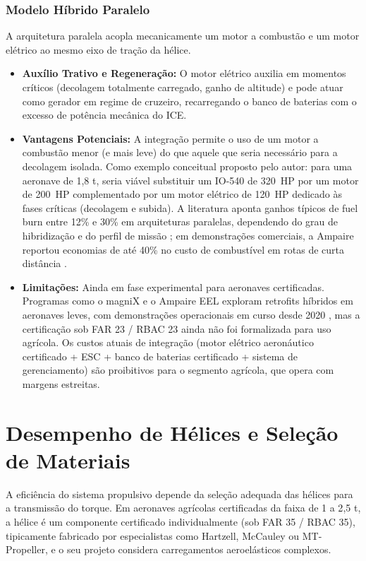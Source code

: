 \documentclass[a4paper,12pt]{article}
\begin{document}
\subsubsection{Modelo Híbrido Paralelo}
A arquitetura paralela acopla mecanicamente um motor a combustão e um motor elétrico ao mesmo eixo de tração da hélice.

\begin{itemize}
    \item \textbf{Auxílio Trativo e Regeneração:} O motor elétrico auxilia em momentos críticos (decolagem totalmente carregado, ganho de altitude) e pode atuar como gerador em regime de cruzeiro, recarregando o banco de baterias com o excesso de potência mecânica do ICE.
    \item \textbf{Vantagens Potenciais:} A integração permite o uso de um motor a combustão menor (e mais leve) do que aquele que seria necessário para a decolagem isolada. Como exemplo conceitual proposto pelo autor: para uma aeronave de 1{,}8 t, seria viável substituir um IO-540 de \SI{320}{HP} por um motor de \SI{200}{HP} complementado por um motor elétrico de \SI{120}{HP} dedicado às fases críticas (decolagem e subida). A literatura aponta ganhos típicos de fuel burn entre 12\% e 30\% em arquiteturas paralelas, dependendo do grau de hibridização e do perfil de missão \cite{sciencedirect_hybrid, fuel_economy_hybrid}; em demonstrações comerciais, a Ampaire reportou economias de até 40\% no custo de combustível em rotas de curta distância \cite{ampaire_demo}.
    \item \textbf{Limitações:} Ainda em fase experimental para aeronaves certificadas. Programas como o magniX e o Ampaire EEL exploram retrofits híbridos em aeronaves leves, com demonstrações operacionais em curso desde 2020 \cite{ampaire_demo, wiki_hybrid_electric}, mas a certificação sob FAR 23 / RBAC 23 ainda não foi formalizada para uso agrícola. Os custos atuais de integração (motor elétrico aeronáutico certificado + ESC + banco de baterias certificado + sistema de gerenciamento) são proibitivos para o segmento agrícola, que opera com margens estreitas.
\end{itemize}

\section{Desempenho de Hélices e Seleção de Materiais}

A eficiência do sistema propulsivo depende da seleção adequada das hélices para a transmissão do torque. Em aeronaves agrícolas certificadas da faixa de 1 a 2{,}5 t, a hélice é um componente certificado individualmente (sob FAR 35 / RBAC 35), tipicamente fabricado por especialistas como Hartzell, McCauley ou MT-Propeller, e o seu projeto considera carregamentos aeroelásticos complexos. 
\end{document}
